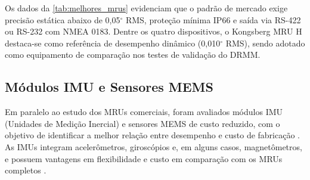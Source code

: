 \documentclass[a4paper, 12pt]{article}
\begin{document}
    Os dados da \autoref{tab:melhores_mrus} evidenciam que o padrão de mercado exige precisão estática abaixo de 0,05$^\circ$ RMS, proteção mínima IP66 e saída via RS-422 ou RS-232 com NMEA 0183. Dentre os quatro dispositivos, o Kongsberg MRU H destaca-se como referência de desempenho dinâmico (0,010$^\circ$ RMS), sendo adotado como equipamento de comparação nos testes de validação do DRMM.

\subsection{Módulos IMU e Sensores MEMS}

    Em paralelo ao estudo dos MRUs comerciais, foram avaliados módulos IMU (Unidades de Medição Inercial) e sensores MEMS de custo reduzido, com o objetivo de identificar a melhor relação entre desempenho e custo de fabricação \cite{embarcados2019}. As IMUs integram acelerômetros, giroscópios e, em alguns casos, magnetômetros, e possuem vantagens em flexibilidade e custo em comparação com os MRUs completos \cite{moraes2015}.
\end{document}
